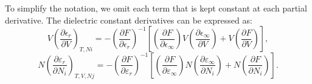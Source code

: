 To simplify the notation, we omit each term that is kept constant at each partial derivative. The dielectric constant derivatives can be expressed as:
\begin{equation}
        V\left ( \frac{\partial \epsilon_r}{\partial V} \right )_{T,Ni} = -\left ( \frac{\partial F}{\partial \epsilon_r} \right )^{-1}\left [  \left ( \frac{\partial F}{\partial \epsilon_\infty} \right )V\left ( \frac{\partial \epsilon_\infty}{\partial V} \right ) + V\left ( \frac{\partial F}{\partial V} \right ) \right ],
        \label{Ffunction_V}
\end{equation} 
\begin{equation}
        N\left ( \frac{\partial \varepsilon_r}{\partial N_i} \right )_{T, V, Nj} = -\left ( \frac{\partial F}{\partial \varepsilon_r} \right )^{-1}\left [  \left ( \frac{\partial F}{\partial \varepsilon_\infty} \right )N\left ( \frac{\partial \varepsilon_\infty}{\partial N_i} \right ) + N\left ( \frac{\partial F}{\partial N_i} \right ) \right ].
        \label{Ffunction_N}
\end{equation} 

